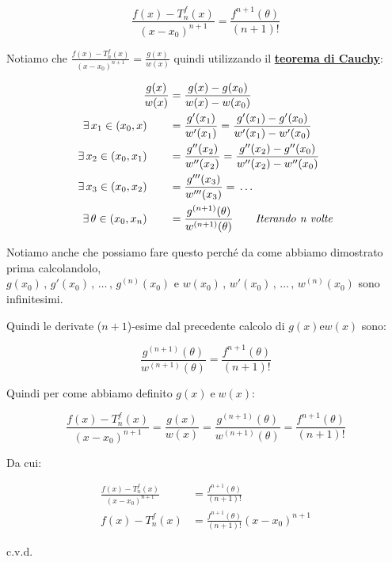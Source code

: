 \documentclass[../dimostrazioni]{subfiles}
\begin{document}
            \[  \frac{f(x) - T _n ^ f (x)}{(x-x_0)^{n+1}} = \frac{f^{n+1}(\theta)}{(n+1)!}    \]

            Notiamo che \(  \frac{f(x) - T _n ^ f (x)}{(x-x_0)^{n+1}} = \frac{g(x)}{w(x)}    \) quindi utilizzando il \textbf{\hyperref[teoCauchy]{teorema di Cauchy}}:

            \begin{align*}
                \frac{g(x)}{w(x)} &= \frac{g(x) - g(x_0)}{w(x) - w(x_0)}\\
                \exists \, x_1 \in (x_0, x) \qquad &= \frac{g'(x_1)}{w'(x_1)} = \frac{g'(x_1) - g'(x_0)}{w'(x_1) - w'(x_0)}\\
                \exists \, x_2 \in (x_0, x_1) \qquad &= \frac{g''(x_2)}{w''(x_2)} = \frac{g''(x_2) - g''(x_0)}{w''(x_2) - w''(x_0)}\\
                \exists \, x_3 \in (x_0, x_2) \qquad &= \frac{g'''(x_3)}{w'''(x_3)} = \, \dots\\
                \exists \, \theta \in (x_0, x_n) \qquad &= \frac{g^{(n+1)}(\theta)}{w^{(n+1)}(\theta)} \qquad \text{\emph{Iterando n volte}}
            \end{align*}

            Notiamo anche che possiamo fare questo perché da come abbiamo dimostrato prima calcolandolo,\\
            \(g(x_0)\,,\, g'(x_0)\,,\, \dots\,,\, g^{(n)} (x_0) \) e \( w(x_0)\,,\, w'(x_0)\,,\, \dots\,,\, w^{(n)} (x_0)\) sono infinitesimi.\\

            \newpage
            
            Quindi le derivate (\(n+1\))-esime dal precedente calcolo di \(g(x) \text{e} w(x)\) sono:

            \[  \frac{g^{(n+1)}(\theta)}{w^{(n+1)}(\theta)} = \frac{f^{n+1}(\theta)}{(n+1)!} \]

            Quindi per come abbiamo definito \(g(x) \; \text{e} \; w(x)\):

            \[  \frac{f(x) - T _n ^ f (x)}{(x-x_0)^{n+1}} = \frac{g(x)}{w(x)} = \frac{g^{(n+1)}(\theta)}{w^{(n+1)}(\theta)} = \frac{f^{n+1}(\theta)}{(n+1)!}   \]

            Da cui:

            \begin{align*}
                \frac{f(x) - T _n ^ f (x)}{(x-x_0)^{n+1}} &= \frac{f^{n+1}(\theta)}{(n+1)!}\\
                f(x) - T _n ^ f (x) &= \frac{f^{n+1}(\theta)}{(n+1)!}(x-x_0)^{n+1}
            \end{align*}

            c.v.d.
        
\end{document}
